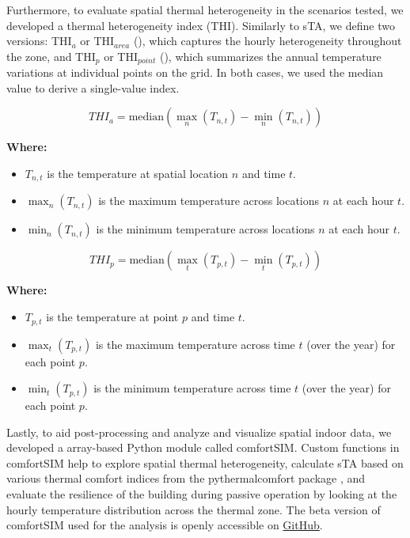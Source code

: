 Furthermore, to evaluate spatial thermal heterogeneity in the scenarios tested, we developed a thermal heterogeneity index (THI). Similarly to sTA, we define two versions: THI$_a$ or THI$_{area}$ (), which captures the hourly heterogeneity throughout the zone, and THI$_p$ or THI$_{point}$ (), which summarizes the annual temperature variations at individual points on the grid. In both cases, we used the median value to derive a single-value index.

\begin{equation}\label{eq:thi-area}
    THI_a = \text{median}\left( \max_{n}(T_{n,t}) - \min_{n}(T_{n,t}) \right)
\end{equation}

\textbf{Where:}
\begin{itemize}
    \item $T_{n,t}$ is the temperature at spatial location $n$ and time $t$.
    \item $\max_{n}(T_{n,t})$ is the maximum temperature across locations $n$ at each hour $t$.
    \item $\min_{n}(T_{n,t})$ is the minimum temperature across locations $n$ at each hour $t$.
\end{itemize}

\begin{equation}\label{eq:thi-point}
    THI_p = \text{median}\left( \max_{t}(T_{p,t}) - \min_{t}(T_{p,t}) \right)
\end{equation}

\textbf{Where:}
\begin{itemize}
    \item $T_{p,t}$ is the temperature at point $p$ and time $t$.
    \item $\max_{t}(T_{p,t})$ is the maximum temperature across time $t$ (over the year) for each point $p$.
    \item $\min_{t}(T_{p,t})$ is the minimum temperature across time $t$ (over the year) for each point $p$.
\end{itemize}

\vspace{0.25cm}

Lastly, to aid post-processing and analyze and visualize spatial indoor data, we developed a array-based Python module called comfortSIM. Custom functions in comfortSIM help to explore spatial thermal heterogeneity, calculate sTA based on various thermal comfort indices from the pythermalcomfort package \citep{tartarini_pythermalcomfort_2020}, and evaluate the resilience of the building during passive operation by looking at the hourly temperature distribution across the thermal zone. The beta version of comfortSIM used for the analysis is openly accessible on \href{https://github.com/t-kramer/comfortSIM}{GitHub}.

